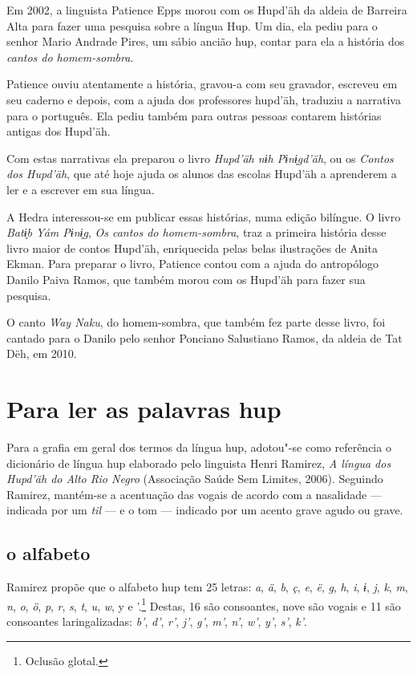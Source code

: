 Em 2002, a linguista Patience Epps morou com os Hupd’äh da aldeia de Barreira Alta para fazer uma pesquisa sobre a língua Hup. Um dia, ela pediu para o senhor Mario Andrade Pires, um sábio ancião hup, contar para ela a história dos \textit{cantos do homem-sombra}.

Patience ouviu atentamente a história, gravou-a com seu gravador, escreveu em seu caderno e depois, com a ajuda dos professores hupd’äh, traduziu a narrativa para o português. Ela pediu também para outras pessoas contarem histórias antigas dos Hupd’äh.

Com estas narrativas ela preparou o livro \textit{Hupd’äh nɨh Pɨnɨ̗gd’äh}, ou os \textit{Contos dos Hupd’äh}, que até hoje ajuda os alunos das escolas Hupd’äh a aprenderem a ler e a escrever em sua língua.

A Hedra interessou-se em publicar essas histórias, numa edição bilíngue. O livro \textit{Batɨ̗b  Yám Pɨnɨ̗g}, \textit{Os cantos do homem-sombra}, traz a primeira história desse livro maior de contos Hupd’äh, enriquecida pelas belas ilustrações de Anita Ekman. Para preparar o livro, Patience contou com a ajuda do antropólogo Danilo Paiva Ramos, que também morou com os Hupd’äh para fazer sua pesquisa.

O canto \textit{Way Naku}, do homem-sombra, que também fez parte desse livro, foi cantado
para o Danilo pelo senhor Ponciano Salustiano Ramos, da aldeia de Tat Dëh, em 2010.

\chapter{Para ler as palavras hup}

Para a grafia em geral dos termos da língua hup, adotou"-se como
referência o dicionário de língua hup elaborado pelo linguista Henri
Ramirez, \textit{A língua dos Hupd'äh do Alto Rio Negro} (Associação Saúde
Sem Limites, 2006). Seguindo Ramirez, mantém-se a acentuação
das vogais de acordo com a nasalidade --- indicada por um \textit{til} --- e o tom --- indicado por um acento grave agudo ou grave.

\section{o alfabeto}

Ramirez propõe que o alfabeto hup tem 25 letras: \textit{a}, \textit{ä}, \textit{b}, \textit{ç}, \textit{e}, \textit{ë}, \textit{g},
\textit{h}, \textit{i}, \textit{ɨ}, \textit{j}, \textit{k}, \textit{m}, \textit{n}, \textit{o}, \textit{ö}, \textit{p}, \textit{r}, \textit{s}, \textit{t}, \textit{u}, \textit{w}, y e '.\footnote{Oclusão
glotal.} Destas, 16 são consoantes, nove são vogais e 11 são consoantes
laringalizadas: \textit{b'}, \textit{d'}, \textit{r'}, \textit{j'}, \textit{g'}, \textit{m'}, \textit{n'}, \textit{w'}, \textit{y'}, \textit{s'}, \textit{k'}.


